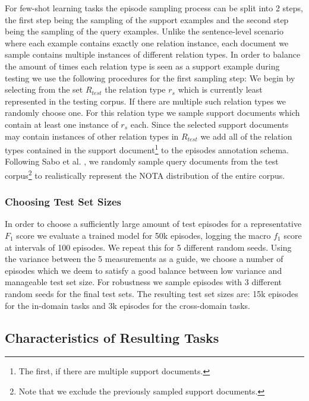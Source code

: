 \documentclass[11pt]{article}
\begin{document}
For few-shot learning tasks the episode sampling process can be split into 2 steps, the first step being the sampling of the support examples and the second step being the sampling of the query examples. 
Unlike the sentence-level scenario where each example contains exactly one relation instance, each document we sample contains multiple instances of different relation types. 
In order to balance the amount of times each relation type is seen as a support example during testing we use the following procedures for the first sampling step: 
We begin by selecting from the set $R_{test}$ the relation type $r_s$ which is currently least represented in the testing corpus. 
If there are multiple such relation types we randomly choose one. 
For this relation type we sample support documents which contain at least one instance of $r_s$ each. 
Since the selected support documents may contain instances of other relation types in $R_{test}$ we add all of the relation types contained in the support document\footnote{The first, if there are multiple support documents.} to the episodes annotation schema. 
Following Sabo et al. \cite{sabo_revisiting_2021}, we randomly sample query documents from the test corpus\footnote{Note that we exclude the previously sampled support documents.} to realistically represent the NOTA distribution of the entire corpus.

\subsubsection{Choosing Test Set Sizes}


In order to choose a sufficiently large amount of test episodes for a representative $F_1$ score we evaluate a trained model for 50k episodes, logging the macro $f_1$ score at intervals of 100 episodes. 
We repeat this for 5 different random seeds. 
Using the variance between the 5 measurements as a guide, we choose a number of episodes which we deem to satisfy a good balance between low variance and manageable test set size. 
For robustness we sample episodes with 3 different random seeds for the final test sets.
The resulting test set sizes are: 15k episodes for the in-domain tasks and 3k episodes for the cross-domain tasks.

\subsection{Characteristics of Resulting Tasks}
\end{document}
